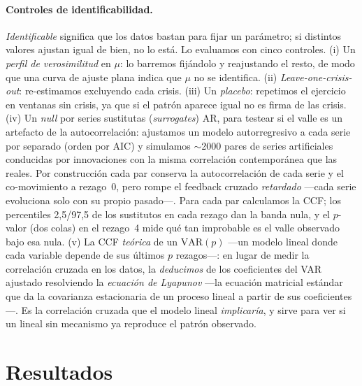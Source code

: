 \documentclass[11pt]{article}
\begin{document}
\paragraph{Controles de identificabilidad.} \emph{Identificable} significa que los datos bastan para
fijar un parámetro; si distintos valores ajustan igual de bien, no lo está. Lo evaluamos con cinco
controles. (i) Un \emph{perfil de verosimilitud} en $\mu$: lo barremos fijándolo y reajustando el
resto, de modo que una curva de ajuste plana indica que $\mu$ no se identifica. (ii)
\emph{Leave-one-crisis-out}: re-estimamos excluyendo cada crisis. (iii) Un \emph{placebo}: repetimos
el ejercicio en ventanas sin crisis, ya que si el patrón aparece igual no es firma de las crisis.
(iv) Un \emph{null} por series sustitutas (\emph{surrogates}) AR, para testear si el valle es un
artefacto de la autocorrelación: ajustamos un modelo autorregresivo a cada serie por separado (orden
por AIC) y simulamos $\sim$2000 pares de series artificiales conducidas por innovaciones con la
misma correlación contemporánea que las reales. Por construcción cada par conserva la autocorrelación
de cada serie y el co-movimiento a rezago~0, pero rompe el feedback cruzado \emph{retardado}
---cada serie evoluciona solo con su propio pasado---. Para cada par calculamos la CCF; los
percentiles 2,5/97,5 de los sustitutos en cada rezago dan la banda nula, y el $p$-valor (dos colas)
en el rezago~4 mide qué tan improbable es el valle observado bajo esa nula. (v) La
CCF \emph{teórica} de un $\mathrm{VAR}(p)$ ---un modelo lineal donde cada variable depende de sus
últimos $p$ rezagos---: en lugar de medir la correlación cruzada en los datos, la \emph{deducimos}
de los coeficientes del VAR ajustado resolviendo la \emph{ecuación de Lyapunov} ---la ecuación
matricial estándar que da la covarianza estacionaria de un proceso lineal a partir de sus
coeficientes---. Es la correlación cruzada que el modelo lineal \emph{implicaría}, y sirve para ver
si un lineal sin mecanismo ya reproduce el patrón observado.

\section{Resultados}
\end{document}
